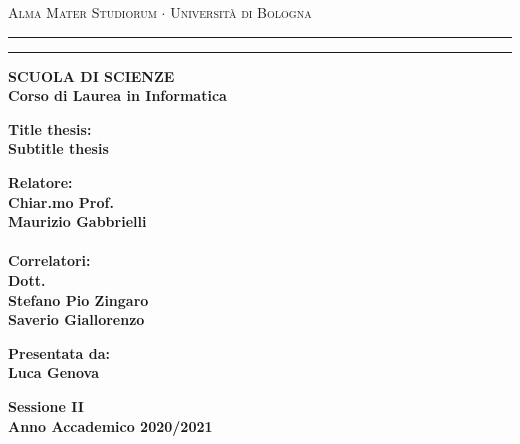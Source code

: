 \documentclass[12pt,a4paper]{report}
\begin{document}
\begin{titlepage}
\begin{center}
{{\Large{\textsc{Alma Mater Studiorum $\cdot$ Universit\`a di
Bologna}}}} \rule[0.1cm]{15.8cm}{0.1mm}
\rule[0.5cm]{15.8cm}{0.6mm}
{\small{\bf SCUOLA DI SCIENZE\\
Corso di Laurea in Informatica }}
\end{center}
\vspace{15mm}

\begin{center}
{\LARGE{\bf Title thesis:}}\\
\vspace{3mm}
{\LARGE{\bf Subtitle thesis}}\\
\end{center}
\vspace{40mm}
\par
\noindent
\begin{minipage}[t]{0.47\textwidth}
{\large{\bf Relatore:\\
Chiar.mo Prof.\\
Maurizio Gabbrielli\\
\\
Correlatori:\\
Dott.\\
Stefano Pio Zingaro\\
Saverio Giallorenzo\\
}}
\end{minipage}
\hfill
\begin{minipage}[t]{0.47\textwidth}\raggedleft
{\large{\bf Presentata da:\\
Luca Genova}}
\end{minipage}
\vspace{20mm}
\begin{center}
{\large{\bf Sessione II\\%
Anno Accademico 2020/2021}}%
\end{center}
\end{titlepage}
\end{document}
